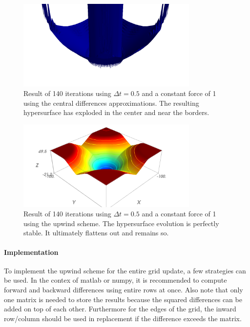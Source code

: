 \documentclass{article}
\begin{document}
\begin{figure}[H]
  \centering
  \includegraphics[width=0.8\textwidth]{img/up03.png}
  \caption{Result of 140 iterations using $\Delta t = 0.5$ and a constant force
  of 1 using the central differences approximations. The resulting hypersurface
  has exploded in the center and near the borders.}    
\end{figure}

\begin{figure}[H]
  \centering
  \includegraphics[width=0.8\textwidth]{img/up02.png}
  \caption{Result of 140 iterations using $ \Delta t = 0.5$ and a constant force
  of 1 using the upwind scheme. The hypersurface evolution is perfectly stable.
  It ultimately flattens out and remains so.}    
\end{figure}

\paragraph{Implementation}
To implement the upwind scheme for the entire grid
update, a few strategies can be used. In the contex of matlab or numpy, it is
recommended to compute forward and backward differences using entire rows at
once. Also note that only one matrix is needed to store the results because the
squared differences can be added on top of each other.  Furthermore for the
edges of the grid, the inward row/column should be used in replacement if the
difference exceeds the matrix.
\end{document}
